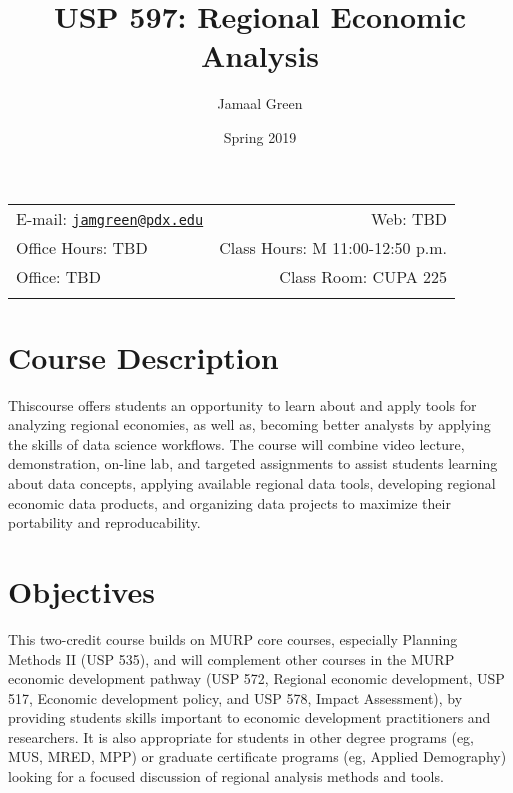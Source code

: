 \documentclass[11pt,]{article}
\title{USP 597: Regional Economic Analysis}
\author{Jamaal Green}
\date{Spring 2019}
\begin{document}
  

		\maketitle
		
	
		\thispagestyle{firststyle}



	\noindent \begin{tabular*}{\textwidth}{ @{\extracolsep{\fill}} lr @{\extracolsep{\fill}}}


E-mail: \texttt{\href{mailto:jamgreen@pdx.edu}{\nolinkurl{jamgreen@pdx.edu}}} & Web: TBD\\
Office Hours: TBD  &  Class Hours: M 11:00-12:50 p.m.\\
Office: TBD  & Class Room: CUPA 225\\
	&  \\
	\hline
	\end{tabular*}
	
\vspace{2mm}
	


\section{Course Description}\label{course-description}

Thiscourse offers students an opportunity to learn about and apply tools
for analyzing regional economies, as well as, becoming better analysts
by applying the skills of data science workflows. The course will
combine video lecture, demonstration, on-line lab, and targeted
assignments to assist students learning about data concepts, applying
available regional data tools, developing regional economic data
products, and organizing data projects to maximize their portability and
reproducability.

\section{Objectives}\label{objectives}

This two-credit course builds on MURP core courses, especially Planning
Methods II (USP 535), and will complement other courses in the MURP
economic development pathway (USP 572, Regional economic development,
USP 517, Economic development policy, and USP 578, Impact Assessment),
by providing students skills important to economic development
practitioners and researchers. It is also appropriate for students in
other degree programs (eg, MUS, MRED, MPP) or graduate certificate
programs (eg, Applied Demography) looking for a focused discussion of
regional analysis methods and tools.
\end{document}
